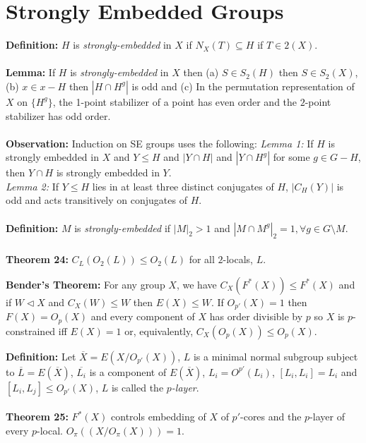 \section {Strongly Embedded Groups}
{\bf Definition:}  $H$ is \emph{strongly-embedded} in $X$ if $N_X(T) \subseteq H$ if $T \in 2(X)$.
\\
\\
{\bf Lemma:} If $H$ is \emph{strongly-embedded} in $X$ then (a) $S \in S_2(H)$ then $S \in S_2(X)$, (b)
$x \in x - H$ then $|H \cap H^g|$ is odd and (c) In the permutation representation of $X$ on $\{H^g\}$,
the 1-point stabilizer of a point has even order and the $2$-point stabilizer has odd order.
\\
\\
{\bf Observation:}  Induction on SE groups uses the following:
\emph{Lemma 1:} If $H$ is strongly embedded in $X$ and $Y \leq H$ and $|Y \cap H|$ and $|Y \cap H^g|$ for
some $g \in G - H$, then $Y \cap H$ is strongly embedded in $Y$.
\\
\emph{Lemma 2:} If $Y \leq H$ lies in at least three distinct conjugates of $H$, $|C_H(Y)|$ is odd and
acts transitively on conjugates of $H$.
\\
\\
{\bf Definition:}  $M$ is \emph{strongly-embedded} if
$|M|_2 > 1$ and $|M \cap M^g|_2=1, \forall g \in G \setminus M$.
\\
\\
{\bf Theorem 24:}
$C_L(O_2(L)) \le O_2(L)$ for all
$2$-locals, $L$.
\begin{quote}
\end{quote}
{\bf Bender's Theorem:} For any group $X$, we have $C_X(F^*(X)) \le F^*(X)$ and if
$W \lhd X$ and $C_X(W) \le W$ then $E(X) \le W$.  If $O_{p'}(X)=1$ then
$F(X)=O_p(X)$ and every component of $X$ has order divisible by $p$ so
$X$ is $p$-constrained iff $E(X)=1$ or, equivalently, $C_X(O_p(X)) \le O_p(X)$.
\begin{quote}
\end{quote}
{\bf Definition:}
Let ${\overline X}= E(X/O_{p'}(X))$, $L$ is a minimal normal subgroup subject to ${\overline L}= E({\overline X})$,
${\overline {L_i}}$ is a component of $E({\overline X})$, $L_i= O^{p'}(L_i)$,
$[L_i, L_i]= L_i$ and $[L_i, L_j] \le O_{p'}(X)$, $L$ is called the \emph{ $p$-layer}. \\
\\
{\bf Theorem 25:}
$F^*(X)$ controls embedding of $X$ of
$p'$-cores and the $p$-layer of every $p$-local.  $O_{\pi}((X/O_{\pi}(X)))=1$.
\begin{quote}
\end{quote}
